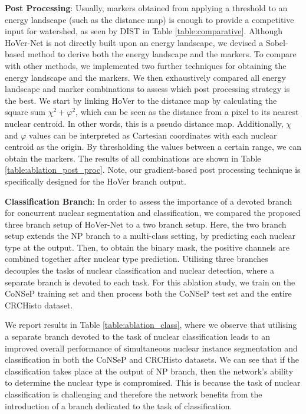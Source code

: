 \documentclass[journal]{IEEEtran}
\begin{document}
	\textbf{Post Processing}: Usually, markers obtained from applying a threshold to an energy landscape (such as the distance map) is enough to provide a competitive input for watershed, as seen by DIST in Table \ref{table:comparative}. Although HoVer-Net is not directly built upon an energy landscape, we devised a Sobel-based method to derive both the energy landscape and the markers. To compare with other methods, we implemented two further techniques for obtaining the energy landscape and the markers. We then exhaustively compared all energy landscape and marker combinations to assess which post processing strategy is the best. We start by linking HoVer to the distance map by calculating the square sum $\chi^2+\varphi^2$, which can be seen as the distance from a pixel to its nearest nuclear centroid. In other words, this is a pseudo distance map. Additionally, $\chi$ and $\varphi$ values can be interpreted as Cartesian coordinates with each nuclear centroid as the origin. By thresholding the values between a certain range, we can obtain the markers. The results of all combinations are shown in Table \ref{table:ablation_post_proc}. Note, our gradient-based post processing technique is specifically designed for the HoVer branch output.
	
	\textbf{Classification Branch}: In order to assess the importance of a devoted branch for concurrent nuclear segmentation and classification, we compared the proposed three branch setup of HoVer-Net to a two branch setup. Here, the two branch setup extends the NP branch to a multi-class setting, by predicting each nuclear type at the output. Then, to obtain the binary mask, the positive channels are combined together after nuclear type prediction. Utilising three branches decouples the tasks of nuclear classification and nuclear detection, where a separate branch is devoted to each task. For this ablation study, we train on the CoNSeP training set and then process both the CoNSeP test set and the entire CRCHisto dataset.
	
	We report results in Table \ref{table:ablation_class}, where we observe that utilising a separate branch devoted to the task of nuclear classification leads to an improved overall performance of simultaneous nuclear instance segmentation and classification in both the CoNSeP and CRCHisto datasets. We can see that if the classification takes place at the output of NP branch, then the network's ability to determine the nuclear type is compromised. This is because the task of nuclear classification is challenging and therefore the network benefits from the introduction of a branch dedicated to the task of classification.  
	
\end{document}
